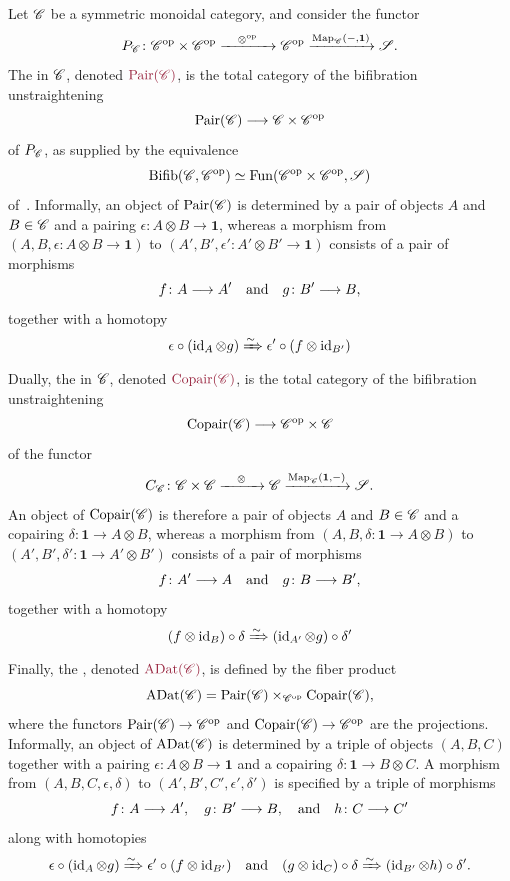\begin{cons}
  Let $\mathscr{C}$ be a symmetric monoidal category, and consider the functor
  \[
    P_{\mathscr{C}}\colon\mathscr{C}^{\mathrm{op}}\times\mathscr{C}^{\mathrm{op}}\xrightarrow{\quad \otimes^{\mathrm{op}}\quad}\mathscr{C}^{\mathrm{op}}\xrightarrow{\operatorname{Map}_{\mathscr{C}}({-},\mathbf 1)}\mathscr{S}.
  \]
  The  in $\mathscr{C}$, denoted $\mdef{\Pair (\cC)}$, is the total category of the bifibration unstraightening
  \[
    \operatorname{Pair} (\mathscr{C})\longrightarrow\mathscr{C}\times\mathscr{C}^{\mathrm{op}}
  \]
  of $P_{\mathscr{C}}$, as supplied by the equivalence
  \[
    \operatorname{Bifib}(\mathscr{C} ,\mathscr{C}^{\mathrm{op}})\simeq\operatorname{Fun} (\mathscr{C}^{\mathrm{op}}\times\mathscr{C}^{\mathrm{op}},\mathscr{S} )
  \]
  of~\cite[Rem~2.5.7(2)]{Haugseng_Hebestreit_Fabian_Linskens_Nuiten2023}. Informally, an object of $\operatorname{Pair} (\mathscr{C})$ is determined by a pair of objects $A$ and $B\in\mathscr{C}$ and a pairing $\epsilon\colon A\otimes B\to\mathbf 1$, whereas a morphism from $(A,B,\epsilon\colon A\otimes B\to\mathbf 1)$ to $(A',B',\epsilon '\colon A'\otimes B'\to\mathbf 1)$ consists of a pair of morphisms
  \[
    f\colon A\longrightarrow A'\quad\text{and}\quad g\colon B'\longrightarrow B,
  \]
  together with a homotopy
  \[
    \epsilon\circ(\operatorname{id}_A\otimes g)\xRightarrow\sim\epsilon '\circ (f\otimes \operatorname{id}_{B'})
  \]
  Dually, the  in $\mathscr{C}$, denoted $\mdef{\Copair(\cC)}$, is the total category of the bifibration unstraightening
  \[
    \operatorname{Copair} (\mathscr{C})\longrightarrow\mathscr{C}^{\mathrm{op}}\times\mathscr{C}
  \]
  of the functor
  \[
    C_{\mathscr{C}}\colon\mathscr{C}\times\mathscr{C}\xrightarrow{\quad \otimes\quad}\mathscr{C}\xrightarrow{\operatorname{Map}_{\mathscr{C}}(\mathbf 1,{-})}\mathscr{S}.
  \]
  An object of $\operatorname{Copair} (\mathscr{C})$ is therefore a pair of objects $A$ and $B\in\mathscr{C}$ and a copairing $\delta\colon \mathbf 1\to A\otimes B$, whereas a morphism from $(A,B,\delta\colon \mathbf 1\to A\otimes B)$ to $(A',B',\delta '\colon \mathbf 1\to A'\otimes B')$ consists of a pair of morphisms
  \[
    f\colon A'\longrightarrow A\quad\text{and}\quad g\colon B\longrightarrow B',
  \]
  together with a homotopy
  \[
    (f\otimes\operatorname{id}_B)\circ\delta\xRightarrow\sim (\operatorname{id}_{A'}\otimes g)\circ \delta '  
  \]
  Finally, the , denoted $\mdef{\assdat (\cC )}$, is defined by the fiber product
  \[
    \operatorname{ADat} (\mathscr{C} ) = \operatorname{Pair} (\mathscr{C} )\times_{\mathscr{C}^{\mathrm{op}}}\operatorname{Copair} (\mathscr{C}),
  \]
  where the functors $\operatorname{Pair} (\mathscr{C})\to\mathscr{C}^{\mathrm{op}}$ and $\operatorname{Copair} (\mathscr{C})\to\mathscr{C}^{\mathrm{op}}$ are the projections.
  Informally, an object of $\operatorname{ADat} (\mathscr{C})$ is determined by a triple of objects $(A,B,C)$ together with a pairing $\epsilon \colon A\otimes B\to\mathbf 1$ and a copairing $\delta\colon \mathbf 1\to B\otimes C$. A morphism from $(A,B,C,\epsilon ,\delta)$ to $(A',B',C',\epsilon ' ,\delta ')$ is specified by a triple of morphisms
  \[
    f\colon A\longrightarrow A',\quad g\colon B'\longrightarrow B,\quad\text{and}\quad h\colon C\longrightarrow C'
  \]
  along with homotopies
  \[
    \epsilon\circ(\operatorname{id}_A\otimes g)\xRightarrow\sim\epsilon '\circ (f\otimes \operatorname{id}_{B'})\quad\text{and}\quad
    (g\otimes\operatorname{id}_C)\circ\delta\xRightarrow\sim (\operatorname{id}_{B'}\otimes h)\circ \delta '.
  \]
\end{cons}
